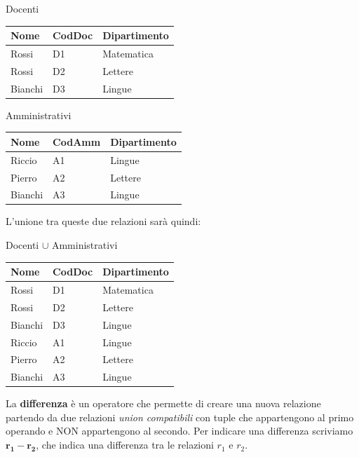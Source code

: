\documentclass[11pt, a4paper, titlepage, oneside]{scrbook}
\begin{document}
\begin{minipage}[c]{0.45\textwidth}
\begin{center}
    Docenti

\begin{tabular}{|l|l|l|}
\hline
\textbf{Nome} & \textbf{CodDoc} & \textbf{Dipartimento} \\ \hline
Rossi & D1 & Matematica \\
Rossi & D2 & Lettere \\
Bianchi & D3 & Lingue \\ \hline
\end{tabular}
\end{center}
\end{minipage}\hfill
\begin{minipage}[c]{0.45\textwidth}
\begin{center}
    Amministrativi

\begin{tabular}{|l|l|l|}
\hline
\textbf{Nome} & \textbf{CodAmm} & \textbf{Dipartimento} \\ \hline
Riccio & A1 & Lingue \\
Pierro & A2 & Lettere \\
Bianchi & A3 & Lingue \\ \hline
\end{tabular}
\end{center}
\end{minipage}

L'unione tra queste due relazioni sarà quindi:

\begin{center}
    Docenti $\cup$ Amministrativi

\begin{tabular}{|l|l|l|}
\hline
\textbf{Nome} & \textbf{CodDoc} & \textbf{Dipartimento} \\ \hline
Rossi & D1 & Matematica \\
Rossi & D2 & Lettere \\
Bianchi & D3 & Lingue \\
Riccio & A1 & Lingue \\
Pierro & A2 & Lettere \\ 
Bianchi & A3 & Lingue \\\hline
\end{tabular}
\end{center}

\begin{Definizione}[Differenza]
\label{def-differenza}
La \textbf{differenza} è un operatore che permette di creare una nuova relazione partendo da due relazioni \textit{union compatibili} con tuple che appartengono al primo operando e NON appartengono al secondo. Per indicare una differenza scriviamo $\bm{r_1 - r_2}$, che indica una differenza tra le relazioni $r_1$ e $r_2$.
\end{Definizione}
\end{document}
